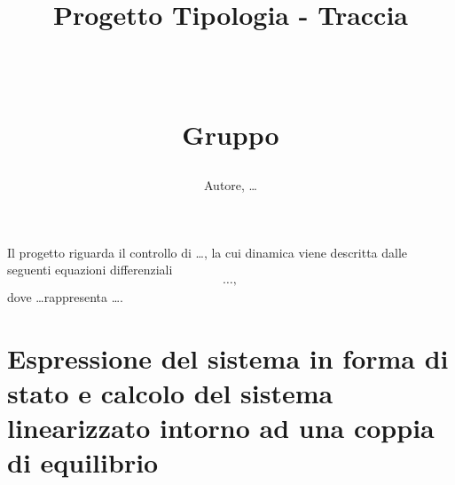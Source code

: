 \documentclass[a4paper, 11pt]{article}
\title{ \vspace{-1in}
		\huge \strut \coursename \strut 
		\\
		\Large  \strut Progetto Tipologia \tipology - Traccia \trace 
		\\
		\Large  \strut \projectname\strut
		\\
		\Large  \strut Gruppo \group\strut
		\vspace{-0.4cm}
}
\author{Autore, \dots}
\date{}
\begin{document}
\maketitle
\vspace{-0.5cm}

Il progetto riguarda il controllo di \dots, la cui dinamica viene descritta dalle seguenti equazioni differenziali 
%
\begin{subequations}\label{eq:system}
\begin{align}
	\dots,
\end{align}
\end{subequations}
%
dove \dots rappresenta \dots.


\section{Espressione del sistema in forma di stato e calcolo del sistema linearizzato intorno ad una coppia di equilibrio}
\end{document}
